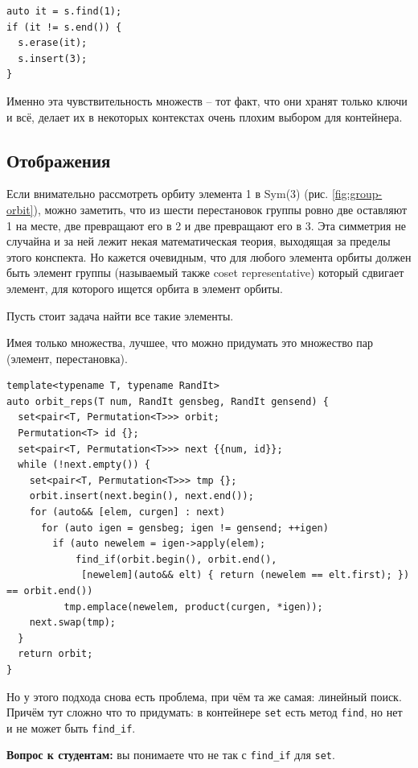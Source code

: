 \documentclass[a4paper,12pt,oneside]{book}
\begin{document}
\begin{lstlisting}
auto it = s.find(1);
if (it != s.end()) {
  s.erase(it);
  s.insert(3);
}
\end{lstlisting}

Именно эта чувствительность множеств -- тот факт, что они хранят только ключи и всё, делает их в некоторых контекстах очень плохим выбором для контейнера.

\subsection{Отображения}

Если внимательно рассмотреть орбиту элемента 1 в Sym(3) (рис. \ref{fig:group-orbit}), можно заметить, что из шести перестановок группы ровно две оставляют 1 на месте, две превращают его в 2 и две превращают его в 3. Эта симметрия не случайна и за ней лежит некая математическая теория, выходящая за пределы этого конспекта. Но кажется очевидным, что для любого элемента орбиты должен быть элемент группы (называемый также coset representative) который сдвигает элемент, для которого ищется орбита в элемент орбиты.

Пусть стоит задача найти все такие элементы.

Имея только множества, лучшее, что можно придумать это множество пар (элемент, перестановка).

\begin{lstlisting}
template<typename T, typename RandIt>
auto orbit_reps(T num, RandIt gensbeg, RandIt gensend) {
  set<pair<T, Permutation<T>>> orbit;
  Permutation<T> id {};
  set<pair<T, Permutation<T>>> next {{num, id}};
  while (!next.empty()) {
    set<pair<T, Permutation<T>>> tmp {};
    orbit.insert(next.begin(), next.end());
    for (auto&& [elem, curgen] : next)
      for (auto igen = gensbeg; igen != gensend; ++igen)
        if (auto newelem = igen->apply(elem);
            find_if(orbit.begin(), orbit.end(), 
             [newelem](auto&& elt) { return (newelem == elt.first); }) == orbit.end())
          tmp.emplace(newelem, product(curgen, *igen));
    next.swap(tmp);
  }
  return orbit;
}
\end{lstlisting}

Но у этого подхода снова есть проблема, при чём та же самая: линейный поиск. Причём тут сложно что то придумать: в контейнере \lstinline!set! есть метод \lstinline!find!, но нет и не может быть \lstinline!find_if!.

\textbf{Вопрос к студентам:} вы понимаете что не так с \lstinline!find_if! для \lstinline!set!.
\end{document}
